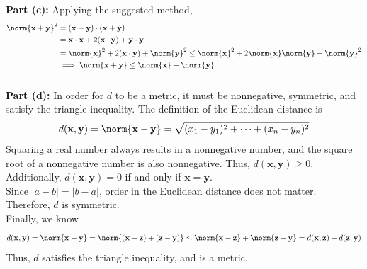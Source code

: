 \documentclass[11pt]{article}
\renewcommand{\b}[1]{\ensuremath{\mathbf{#1}}}
\begin{document}
\begin{homeworkProblem}
    \pagebreak

    \textbf{Part (c):} Applying the suggested method,
    \begin{align*}
        \norm{\b{x} + \b{y}}^2 & = (\b{x} + \b{y}) \cdot (\b{x} + \b{y})                                                                                    \\
                               & = \b{x} \cdot \b{x} + 2 (\b{x} \cdot \b{y}) + \b{y} \cdot \b{y}                                                            \\
                               & = \norm{\b{x}}^2 + 2 (\b{x} \cdot \b{y}) + \norm{\b{y}}^2 \leq \norm{\b{x}}^2 + 2\norm{\b{x}}\norm{\b{y}} + \norm{\b{y}}^2 \\
                               & \implies \norm{\b{x} + \b{y}} \leq \norm{\b{x}} + \norm{\b{y}}                                                             \\                                                             \\
    \end{align*}
    \textbf{Part (d):} In order for $d$ to be a metric, it must be nonnegative, symmetric, and satisfy the triangle inequality. The
    definition of the Euclidean distance is
    \[
        d(\b{x}, \b{y}) = \norm{\b{x} - \b{y}} = \sqrt{(x_1 - y_1)^2 + \cdots + (x_n - y_n)^2}
    \]
    Squaring a real number always results in a nonnegative number, and the square root of a nonnegative
    number is also nonnegative. Thus, $d(\b{x}, \b{y}) \geq 0$. Additionally, $d(\b{x}, \b{y}) = 0$ if and only if $\b{x} = \b{y}$. \\

    Since $|a - b| = |b - a|$, order in the Euclidean distance does not matter. Therefore, $d$ is symmetric. \\

    Finally, we know
    \[
        d(\b{x}, \b{y}) = \norm{\b{x} - \b{y}} = \norm{(\b{x} - \b{z}) + (\b{z} - \b{y})} \leq \norm{\b{x} - \b{z}} + \norm{\b{z} - \b{y}} = d(\b{x}, \b{z}) + d(\b{z}, \b{y})
    \]
    Thus, $d$ satisfies the triangle inequality, and is a metric.
\end{homeworkProblem}

\pagebreak
\end{document}
